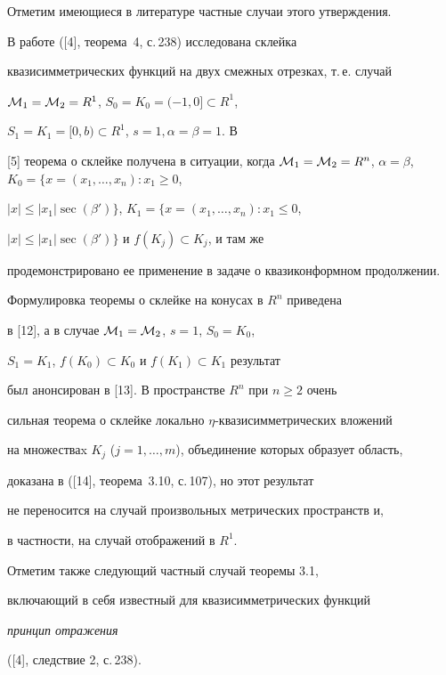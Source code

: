 




Отметим имеющиеся в литературе частные случаи этого утверждения. 


В работе ([4], теорема~4, с.\,238) исследована склейка 


квазисимметрических функций на двух смежных отрезках, т.\,е. случай 


${\cal M}_1=


{\cal M}_2=R^1$, $S_0=K_0=(-1,0] \subset R^1$, 


$S_1=K_1=[0,b) \subset R^1$, $s=1, \alpha=\beta=1$. В 


[5] теорема о склейке получена в ситуации, когда ${\cal M}_1=


{\cal M}_2=R^n$, $\alpha=\beta$, $K_0=\{ x=(x_1,\dotsc,x_n): x_1 \geq 0$, 


$|x| \leq |x_1|\sec(\beta') \} $, $K_1=\{ x=(x_1,\dotsc,x_n): x_1 \leq 0$, 


$|x| \leq |x_1|\sec(\beta') \} $ и $f(K_j) \subset K_j$, и там же 


продемонстрировано ее применение в задаче о квазиконформном продолжении. 


Формулировка теоремы о склейке на конусах в $R^n$ приведена 


в [12], а в случае ${\cal M}_1={\cal M}_2$, $s=1$, $S_0=K_0$, 


$S_1=K_1$, $f(K_0) \subset K_0$ и $f(K_1) \subset K_1$ результат 


был анонсирован в [13]. В пространстве $R^n$ при $n\geq 2$ очень 


сильная теорема о склейке локально $\eta$-{}квазисимметрических вложений 


на множестваx $K_j$ ($j=1,\dotsc,m$), объединение которых образует область, 


доказана в ([14], теорема~3.10, с.\,107), но этот результат 


не переносится на случай произвольных метрических пространств и, 


в частности, на случай отображений в $R^1$.





Отметим также следующий частный случай теоремы 3.1, 


включающий в себя известный для квазисимметрических функций 


{\it принцип отражения}




([4], следствие 2, с.\,238).





